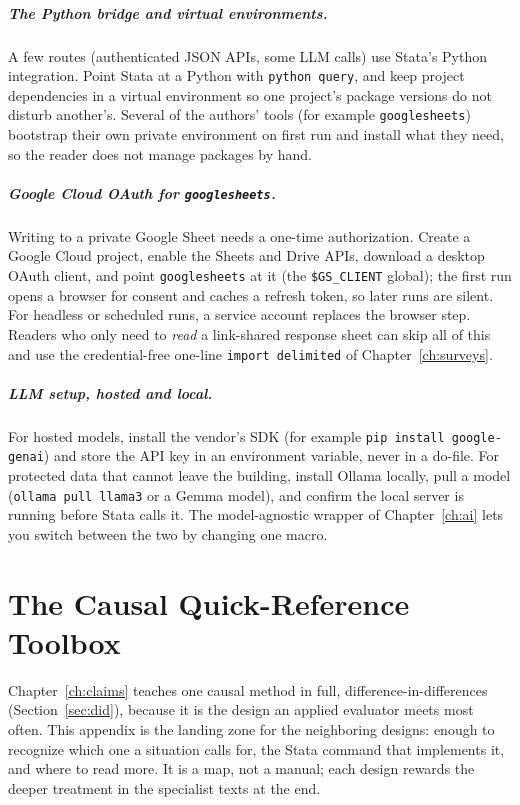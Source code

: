 \documentclass[
    a4paper,
    fontsize=10pt,
    twoside=true,
    numbers=noenddot,
]{kaobook}
\begin{document}
\paragraph{The Python bridge and virtual environments.} A few routes (authenticated JSON APIs, some LLM calls) use Stata's Python integration. Point Stata at a Python with \texttt{python query}, and keep project dependencies in a virtual environment so one project's package versions do not disturb another's. Several of the authors' tools (for example \texttt{googlesheets}) bootstrap their own private environment on first run and install what they need, so the reader does not manage packages by hand.

\paragraph{Google Cloud OAuth for \texttt{googlesheets}.} Writing to a private Google Sheet needs a one-time authorization. Create a Google Cloud project, enable the Sheets and Drive APIs, download a desktop OAuth client, and point \texttt{googlesheets} at it (the \texttt{\$GS\_CLIENT} global); the first run opens a browser for consent and caches a refresh token, so later runs are silent. For headless or scheduled runs, a service account replaces the browser step. Readers who only need to \emph{read} a link-shared response sheet can skip all of this and use the credential-free one-line \texttt{import delimited} of Chapter~\ref{ch:surveys}.

\paragraph{LLM setup, hosted and local.} For hosted models, install the vendor's SDK (for example \texttt{pip install google-genai}) and store the API key in an environment variable, never in a do-file. For protected data that cannot leave the building, install Ollama locally, pull a model (\texttt{ollama pull llama3} or a Gemma model), and confirm the local server is running before Stata calls it. The model-agnostic wrapper of Chapter~\ref{ch:ai} lets you switch between the two by changing one macro.

\chapter{The Causal Quick-Reference Toolbox}\label{app:causal}
Chapter~\ref{ch:claims} teaches one causal method in full, difference-in-differences (Section~\ref{sec:did}), because it is the design an applied evaluator meets most often. This appendix is the landing zone for the neighboring designs: enough to recognize which one a situation calls for, the Stata command that implements it, and where to read more. It is a map, not a manual; each design rewards the deeper treatment in the specialist texts at the end.
\end{document}
